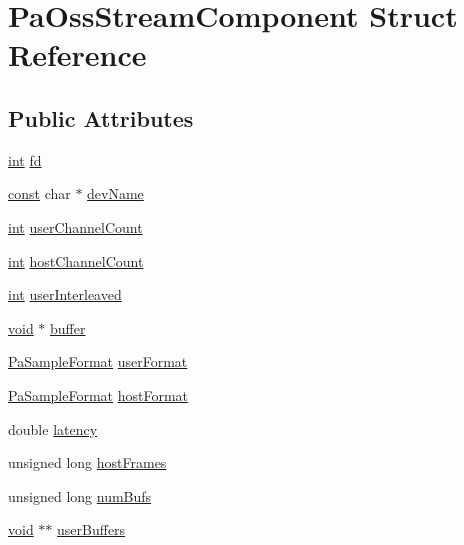\hypertarget{struct_pa_oss_stream_component}{}\section{Pa\+Oss\+Stream\+Component Struct Reference}
\label{struct_pa_oss_stream_component}
\subsection*{Public Attributes}
\begin{DoxyCompactItemize}
\item 
\hyperlink{xmltok_8h_a5a0d4a5641ce434f1d23533f2b2e6653}{int} \hyperlink{struct_pa_oss_stream_component_a8d09b328d855276bb629abc1d072f9ae}{fd}
\item 
\hyperlink{getopt1_8c_a2c212835823e3c54a8ab6d95c652660e}{const} char $\ast$ \hyperlink{struct_pa_oss_stream_component_a4fdcd3579fbc2db73c4db6e0f5b2a5ad}{dev\+Name}
\item 
\hyperlink{xmltok_8h_a5a0d4a5641ce434f1d23533f2b2e6653}{int} \hyperlink{struct_pa_oss_stream_component_a12a88cd8c43b4d70b78b8c3da9403943}{user\+Channel\+Count}
\item 
\hyperlink{xmltok_8h_a5a0d4a5641ce434f1d23533f2b2e6653}{int} \hyperlink{struct_pa_oss_stream_component_afb06f5b856942cabc3732432503d3cb1}{host\+Channel\+Count}
\item 
\hyperlink{xmltok_8h_a5a0d4a5641ce434f1d23533f2b2e6653}{int} \hyperlink{struct_pa_oss_stream_component_ae7c7baf67ac9b4459a63a192ee4c156a}{user\+Interleaved}
\item 
\hyperlink{sound_8c_ae35f5844602719cf66324f4de2a658b3}{void} $\ast$ \hyperlink{struct_pa_oss_stream_component_a5fc847bff7f7e76d02c5427f2d1cace9}{buffer}
\item 
\hyperlink{portaudio_8h_a4582d93c2c2e60e12be3d74c5fe00b96}{Pa\+Sample\+Format} \hyperlink{struct_pa_oss_stream_component_a6a23ff2b04e56455303915b50d22bdf6}{user\+Format}
\item 
\hyperlink{portaudio_8h_a4582d93c2c2e60e12be3d74c5fe00b96}{Pa\+Sample\+Format} \hyperlink{struct_pa_oss_stream_component_aa41af4e1aeb5a24218a5fb6b629ade02}{host\+Format}
\item 
double \hyperlink{struct_pa_oss_stream_component_a1d75c6753337e2e1b41b7208dce08cf5}{latency}
\item 
unsigned long \hyperlink{struct_pa_oss_stream_component_af1038464cf9b2905e8024479ae79958e}{host\+Frames}
\item 
unsigned long \hyperlink{struct_pa_oss_stream_component_ad912ac4010429731817692641b7181ec}{num\+Bufs}
\item 
\hyperlink{sound_8c_ae35f5844602719cf66324f4de2a658b3}{void} $\ast$$\ast$ \hyperlink{struct_pa_oss_stream_component_a416e24ef585da06a25b1a651c6da9154}{user\+Buffers}
\end{DoxyCompactItemize}


